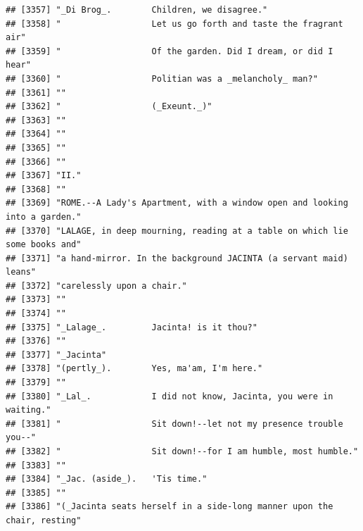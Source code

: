 \documentclass{article}\usepackage[]{graphicx}\usepackage[]{color}
\makeatletter
\newenvironment{kframe}{%
 \def\at@end@of@kframe{}%
 \ifinner\ifhmode%
  \def\at@end@of@kframe{\end{minipage}}%
  \begin{minipage}{\columnwidth}%
 \fi\fi%
 \def\FrameCommand##1{\hskip\@totalleftmargin \hskip-\fboxsep
 \colorbox{shadecolor}{##1}\hskip-\fboxsep
     \hskip-\linewidth \hskip-\@totalleftmargin \hskip\columnwidth}%
 \MakeFramed {\advance\hsize-\width
   \@totalleftmargin\z@ \linewidth\hsize
   \@setminipage}}%
 {\par\unskip\endMakeFramed%
 \at@end@of@kframe}
\newenvironment{knitrout}{}{} %
\makeatother
\begin{document}
\begin{knitrout}
\begin{kframe}
\begin{verbatim}
## [3357] "_Di Brog_.        Children, we disagree."                                    
## [3358] "                  Let us go forth and taste the fragrant air"                
## [3359] "                  Of the garden. Did I dream, or did I hear"                 
## [3360] "                  Politian was a _melancholy_ man?"                          
## [3361] ""                                                                            
## [3362] "                  (_Exeunt._)"                                               
## [3363] ""                                                                            
## [3364] ""                                                                            
## [3365] ""                                                                            
## [3366] ""                                                                            
## [3367] "II."                                                                         
## [3368] ""                                                                            
## [3369] "ROME.--A Lady's Apartment, with a window open and looking into a garden."    
## [3370] "LALAGE, in deep mourning, reading at a table on which lie some books and"    
## [3371] "a hand-mirror. In the background JACINTA (a servant maid) leans"             
## [3372] "carelessly upon a chair."                                                    
## [3373] ""                                                                            
## [3374] ""                                                                            
## [3375] "_Lalage_.         Jacinta! is it thou?"                                      
## [3376] ""                                                                            
## [3377] "_Jacinta"                                                                    
## [3378] "(pertly_).        Yes, ma'am, I'm here."                                     
## [3379] ""                                                                            
## [3380] "_Lal_.            I did not know, Jacinta, you were in waiting."             
## [3381] "                  Sit down!--let not my presence trouble you--"              
## [3382] "                  Sit down!--for I am humble, most humble."                  
## [3383] ""                                                                            
## [3384] "_Jac. (aside_).   'Tis time."                                                
## [3385] ""                                                                            
## [3386] "(_Jacinta seats herself in a side-long manner upon the chair, resting"       

\end{verbatim}
\end{kframe}
\end{knitrout}
\end{document}
